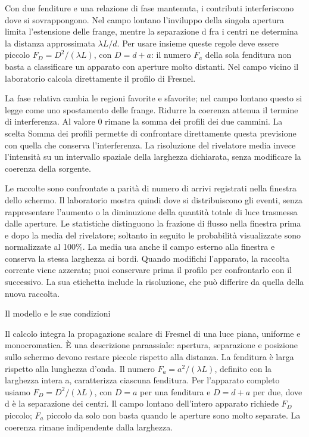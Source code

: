Con due fenditure e una relazione di fase mantenuta, i contributi interferiscono dove si sovrappongono. Nel campo lontano l'inviluppo della singola apertura limita l'estensione delle frange, mentre la separazione d fra i centri ne determina la distanza approssimata \(\lambda L/d\). Per usare insieme queste regole deve essere piccolo \(F_{D}=D^{2}/(\lambda L)\), con \(D=d+a\): il numero \(F_{a}\) della sola fenditura non basta a classificare un apparato con aperture molto distanti. Nel campo vicino il laboratorio calcola direttamente il profilo di Fresnel.\par

La fase relativa cambia le regioni favorite e sfavorite; nel campo lontano questo si legge come uno spostamento delle frange. Ridurre la coerenza attenua il termine di interferenza. Al valore 0 rimane la somma dei profili dei due cammini. La scelta \guillemotleft{}Somma dei profili\guillemotright{} permette di confrontare direttamente questa previsione con quella che conserva l'interferenza. La risoluzione del rivelatore media invece l'intensità su un intervallo spaziale della larghezza dichiarata, senza modificare la coerenza della sorgente.\par

Le raccolte sono confrontate a parità di numero di arrivi registrati nella finestra dello schermo. Il laboratorio mostra quindi dove si distribuiscono gli eventi, senza rappresentare l'aumento o la diminuzione della quantità totale di luce trasmessa dalle aperture. Le statistiche distinguono la frazione di flusso nella finestra prima e dopo la media del rivelatore; soltanto in seguito le probabilità visualizzate sono normalizzate al 100\%. La media usa anche il campo esterno alla finestra e conserva la stessa larghezza ai bordi. Quando modifichi l'apparato, la raccolta corrente viene azzerata; puoi conservare prima il profilo per confrontarlo con il successivo. La sua etichetta include la risoluzione, che può differire da quella della nuova raccolta.\par


Il modello e le sue condizioni\par

Il calcolo integra la propagazione scalare di Fresnel di una luce piana, uniforme e monocromatica. È una descrizione paraassiale: apertura, separazione e posizione sullo schermo devono restare piccole rispetto alla distanza. La fenditura è larga rispetto alla lunghezza d'onda. Il numero \(F_{a}=a^{2}/(\lambda L)\), definito con la larghezza intera a, caratterizza ciascuna fenditura. Per l'apparato completo usiamo \(F_{D}=D^{2}/(\lambda L)\), con \(D=a\) per una fenditura e \(D=d+a\) per due, dove d è la separazione dei centri. Il campo lontano dell'intero apparato richiede \(F_{D}\) piccolo; \(F_{a}\) piccolo da solo non basta quando le aperture sono molto separate. La coerenza rimane indipendente dalla larghezza.\par

